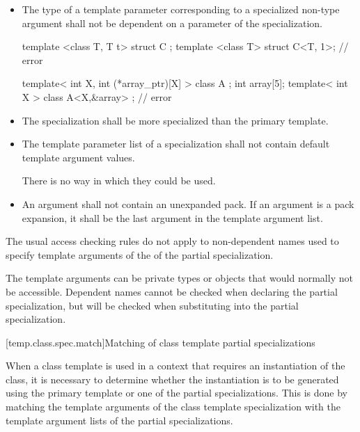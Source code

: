 \begin{itemize}
\item
The type of a template parameter corresponding to a specialized non-type argument
shall not be dependent on a parameter of the specialization.
\begin{example}
\begin{codeblock}
template <class T, T t> struct C {};
template <class T> struct C<T, 1>;              // error

template< int X, int (*array_ptr)[X] > class A {};
int array[5];
template< int X > class A<X,&array> { };        // error
\end{codeblock}

\end{example}
\item
The specialization shall be more specialized than the primary
template.

\item
The template parameter list of a specialization shall not contain default
template argument values.
\begin{footnote}
There is no way in which they could be used.
\end{footnote}
\item
An argument shall not contain an unexpanded pack. If
an argument is a pack expansion, it shall be
the last argument in the template argument list.
\end{itemize}

\pnum
The usual access checking rules do not apply to non-dependent names
used to specify template arguments of the 
of the partial specialization.
\begin{note}
The template arguments can be private types or
objects that would normally not be accessible.
Dependent names cannot be checked when declaring the partial specialization,
but will be checked when substituting into the partial specialization.
\end{note}

[temp.class.spec.match]{Matching of class template partial specializations}

\pnum
When a class template is used in a context that requires an instantiation of
the class,
it is necessary to determine whether the instantiation is to be generated
using the primary template or one of the partial specializations.
This is done by matching the template arguments of the class template
specialization with the template argument lists of the partial
specializations.

